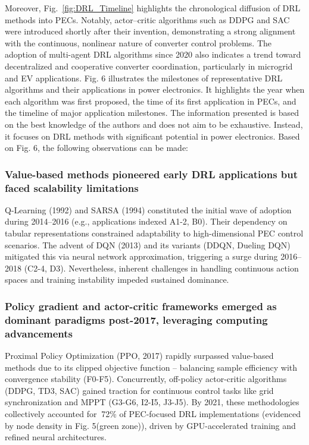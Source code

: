Moreover, Fig.~\ref{fig:DRL_Timeline} highlights the chronological diffusion of DRL methods into PECs. Notably, actor–critic algorithms such as DDPG and SAC were introduced shortly after their invention, demonstrating a strong alignment with the continuous, nonlinear nature of converter control problems. The adoption of multi-agent DRL algorithms since 2020 also indicates a trend toward decentralized and cooperative converter coordination, particularly in microgrid and EV applications. Fig. 6 illustrates the milestones of representative DRL algorithms and their applications in power electronics. It highlights the year when each algorithm was first proposed, the time of its first application in PECs, and the timeline of major application milestones. The information presented is based on the best knowledge of the authors and does not aim to be exhaustive. Instead, it focuses on DRL methods with significant potential in power electronics. Based on Fig. 6, the following observations can be made:

\subsubsection{Value-based methods pioneered early DRL applications but faced scalability limitations} Q-Learning (1992) and SARSA (1994) constituted the initial wave of adoption during 2014–2016 (e.g., applications indexed A1-2, B0). Their dependency on tabular representations constrained adaptability to high-dimensional PEC control scenarios. The advent of DQN (2013) and its variants (DDQN, Dueling DQN) mitigated this via neural network approximation, triggering a surge during 2016–2018 (C2-4, D3). Nevertheless, inherent challenges in handling continuous action spaces and training instability impeded sustained dominance.

\subsubsection{Policy gradient and actor-critic frameworks emerged as dominant paradigms post-2017, leveraging computing advancements} Proximal Policy Optimization (PPO, 2017) rapidly surpassed value-based methods due to its clipped objective function – balancing sample efficiency with convergence stability (F0-F5). Concurrently, off-policy actor-critic algorithms (DDPG, TD3, SAC) gained traction for continuous control tasks like grid synchronization and MPPT (G3-G6, I2-I5, J3-J5). By 2021, these methodologies collectively accounted for $\>$72\% of PEC-focused DRL implementations (evidenced by node density in Fig. 5(green zone)), driven by GPU-accelerated training and refined neural architectures.


